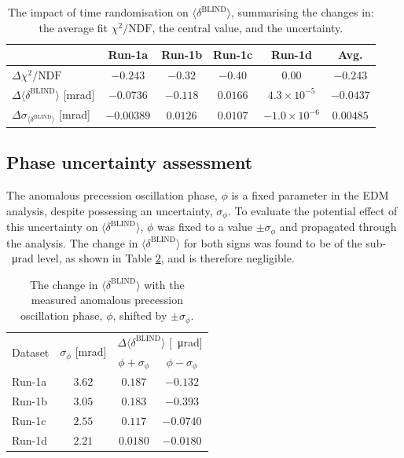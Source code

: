 \begin{table}[t!]
\centering{}
\begin{tabular}{l|ccccc}
\hline
\hline
 & Run-1a & Run-1b & Run-1c & Run-1d & Avg. \\ 
 \hline
$\Delta \chi^{2}/\text{NDF}$ & $-0.243$ & $-0.32$ & $-0.40$ & $0.00$ & $-0.243$ \\
$\Delta \langle \delta^{\text{BLIND}} \rangle$ [mrad] & $-0.0736$ & $-0.118$ & $0.0166$ & $4.3\times10^{-5}$ & $-0.0437$ \\
$\Delta \sigma_{\langle \delta^{\text{BLIND}} \rangle}$ [mrad] & $-0.00389$ & $0.0126$ & $0.0107$ & $-1.0\times10^{-6}$ & $0.00485$ \\
\hline
\hline
\end{tabular}
\caption{The impact of time randomisation on $\langle \delta^{\text{BLIND}} \rangle$, summarising the changes in: the average fit $\chi^{2}/\text{NDF}$, the central value, and the uncertainty.} 
\label{tbl:RandDeltaDiff}
\end{table}

\subsection{Phase uncertainty assessment}\label{sec:PhaseUnc}


The anomalous precession oscillation phase, $\phi$ is a fixed parameter in the EDM analysis, despite possessing an uncertainty, $\sigma_{\phi}$. To evaluate the potential effect of this uncertainty on $\langle \delta^{\text{BLIND}} \rangle$, $\phi$ was fixed to a value $\pm \sigma_{\phi}$ and propagated through the analysis. The change in $\langle \delta^{\text{BLIND}} \rangle$ for both signs was found to be of the sub-\SI{}{\micro\radian} level, as shown in Table \ref{tbl:Run1PhaseUncertainty}, and is therefore negligible.

\clearpage 

\begin{table}[h!]
\centering{}
\begin{tabular}{l|ccc}
\hline
\hline
\multirow{2}{*}{Dataset} & \multirow{2}{*}{$\sigma_{\phi}$ [mrad]} & \multicolumn{2}{c}{$\Delta \langle \delta^{\text{BLIND}} \rangle$ [\SI{}{\micro\radian}]} \\ 
& & $\phi+\sigma_{\phi}$ &  $\phi-\sigma_{\phi}$ \\
\hline
Run-1a & $3.62$ & $0.187$ & $-0.132$ \\ 
Run-1b & $3.05$ & $0.183$ & $-0.393$ \\ 
Run-1c & $2.55$ & $0.117$ & $-0.0740$ \\ 
Run-1d & $2.21$ & $0.0180$ & $-0.0180$ \\ 
\hline
\hline
\end{tabular}
\caption{The change in $\langle \delta^{\text{BLIND}} \rangle$ with the measured anomalous precession oscillation phase, $\phi$, shifted by $\pm\sigma_{\phi}$.} 
\label{tbl:Run1PhaseUncertainty}
\end{table}

